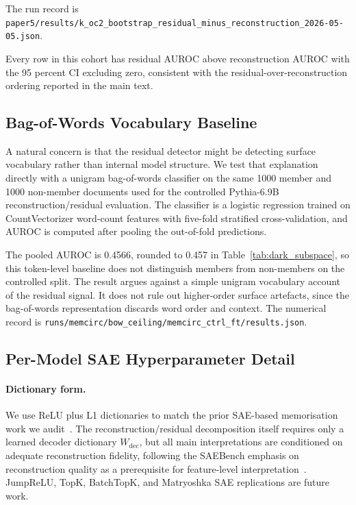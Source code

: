 The run record is \texttt{paper5/\allowbreak{}results/\allowbreak{}k\_\allowbreak{}oc2\_\allowbreak{}bootstrap\_\allowbreak{}residual\_\allowbreak{}minus\_\allowbreak{}reconstruction\_\allowbreak{}2026-\allowbreak{}05-\allowbreak{}05.json}.

Every row in this cohort has residual AUROC above reconstruction AUROC with the 95 percent CI excluding zero, consistent with the residual-over-reconstruction ordering reported in the main text.

\subsection{Bag-of-Words Vocabulary Baseline}
\label{app:bow_baseline}

A natural concern is that the residual detector might be detecting surface vocabulary rather than internal model structure. We test that explanation directly with a unigram bag-of-words classifier on the same 1000 member and 1000 non-member documents used for the controlled Pythia-6.9B reconstruction/residual evaluation. The classifier is a logistic regression trained on CountVectorizer word-count features with five-fold stratified cross-validation, and AUROC is computed after pooling the out-of-fold predictions.

The pooled AUROC is 0.4566, rounded to 0.457 in Table~\ref{tab:dark_subspace}, so this token-level baseline does not distinguish members from non-members on the controlled split. The result argues against a simple unigram vocabulary account of the residual signal. It does not rule out higher-order surface artefacts, since the bag-of-words representation discards word order and context. The numerical record is \texttt{runs/\allowbreak{}memcirc/\allowbreak{}bow\_\allowbreak{}ceiling/\allowbreak{}memcirc\_\allowbreak{}ctrl\_\allowbreak{}ft/\allowbreak{}results.json}.

\subsection{Per-Model SAE Hyperparameter Detail}
\label{app:per_model_hps_detail}

\paragraph{Dictionary form.}
We use ReLU plus L1 dictionaries to match the prior SAE-based memorisation work we audit~\citep{wang2025sspu,frikha2025privacyscalpel,muhamed2025dsg,suri2025mitigating}. The reconstruction/residual decomposition itself requires only a learned decoder dictionary $W_{\mathrm{dec}}$, but all main interpretations are conditioned on adequate reconstruction fidelity, following the SAEBench emphasis on reconstruction quality as a prerequisite for feature-level interpretation~\citep{karvonen2025saebench}. JumpReLU, TopK, BatchTopK, and Matryoshka SAE replications are future work.

